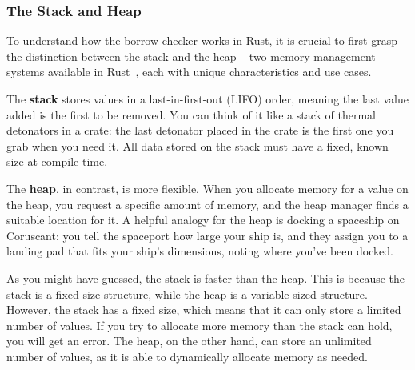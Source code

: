\documentclass[twoside,11pt]{report}
\theoremstyle{definition}
\theoremstyle{plain}
\begin{document}
\subsubsection{The Stack and Heap}
To understand how the borrow checker works in Rust, it is crucial to first grasp the distinction between the stack and the heap -- two memory management systems available in Rust~\cite[ch.4]{rustlangRustProgramming}, each with unique characteristics and use cases.

The \textbf{stack} stores values in a last-in-first-out (LIFO) order, meaning the last value added is the first to be removed. You can think of it like a stack of thermal detonators in a crate: the last detonator placed in the crate is the first one you grab when you need it. All data stored on the stack must have a fixed, known size at compile time.

The \textbf{heap}, in contrast, is more flexible. When you allocate memory for a value on the heap, you request a specific amount of memory, and the heap manager finds a suitable location for it. A helpful analogy for the heap is docking a spaceship on Coruscant: you tell the spaceport how large your ship is, and they assign you to a landing pad that fits your ship's dimensions, noting where you've been docked.

As you might have guessed, the stack is faster than the heap. This is because the stack is a fixed-size structure, while the heap is a variable-sized structure. However, the stack has a fixed size, which means that it can only store a limited number of values. If you try to allocate more memory than the stack can hold, you will get an error. The heap, on the other hand, can store an unlimited number of values, as it is able to dynamically allocate memory as needed.
\end{document}
